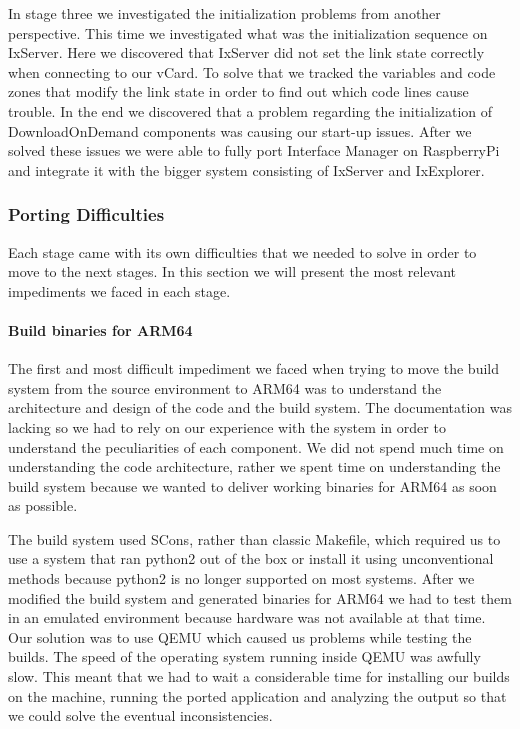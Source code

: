 In stage three we investigated the initialization problems from another
perspective. This time we investigated what was the initialization sequence on
IxServer. Here we discovered that IxServer did not set the link state correctly
when connecting to our vCard. To solve that we tracked the variables and code
zones that modify the link state in order to find out which code lines cause
trouble. In the end we discovered that a problem regarding the initialization
of DownloadOnDemand components was causing our start-up issues. After we solved
these issues we were able to fully port Interface Manager on RaspberryPi and
integrate it with the bigger system consisting of IxServer and IxExplorer.

\subsubsection{Porting Difficulties}

Each stage came with its own difficulties that we needed to solve in order to
move to the next stages. In this section we will present the most relevant
impediments we faced in each stage.

\paragraph{Build binaries for ARM64}

The first and most difficult impediment we faced when trying to move the build
system from the source environment to ARM64 was to understand the architecture
and design of the code and the build system. The documentation was lacking so
we had to rely on our experience with the system in order to understand the
peculiarities of each component. We did not spend much time on understanding the
code architecture, rather we spent time on understanding the build system
because we wanted to deliver working binaries for ARM64 as soon as possible.

The build system used SCons, rather than classic Makefile, which required us to
use a system that ran python2 out of the box or install it using unconventional
methods because python2 is no longer supported on most systems. After we
modified the build system and generated binaries for ARM64 we had to test them
in an emulated environment because hardware was not available at that time. Our
solution was to use QEMU which caused us problems while testing the builds.
The speed of the operating system running inside QEMU was awfully slow. This
meant that we had to wait a considerable time for installing our builds on the
machine, running the ported application and analyzing the output so that we
could solve the eventual inconsistencies.

